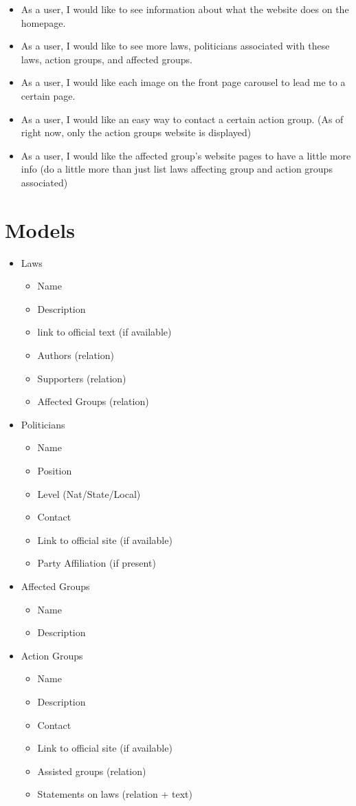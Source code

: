 \documentclass[12pt]{article}
\begin{document}
\begin{itemize}
	\item As a user, I would like to see information about what the website does on the homepage.
	\item As a user, I would like to see more laws, politicians associated with these laws, action groups, and affected groups.
	\item As a user, I would like each image on the front page carousel to lead me to a certain page. 
	\item As a user, I would like an easy way to contact a certain action group. (As of right now, only the action groups website is displayed)
	\item As a user, I would like the affected group's website pages to have a little more info (do a little more than just list laws affecting group and action groups associated)
\end{itemize}

\section{Models}

\begin{itemize}
	\item[] Laws
	\begin{itemize}
		\item Name
		\item Description
		\item link to official text (if available)
		\item Authors (relation)
		\item Supporters (relation)
		\item Affected Groups (relation)
	\end{itemize}
	\item[] Politicians
	\begin{itemize}
		\item Name
		\item Position
		\item Level (Nat/State/Local)
		\item Contact
		\item Link to official site (if available)
		\item Party Affiliation (if present)
	\end{itemize}
	\item[] Affected Groups
	\begin{itemize}
		\item Name
		\item Description
	\end{itemize}
	\item[] Action Groups
	\begin{itemize}
		\item Name
		\item Description
		\item Contact
		\item Link to official site (if available)
		\item Assisted groups (relation)
		\item Statements on laws (relation + text)
	\end{itemize}
\end{itemize}
\end{document}
